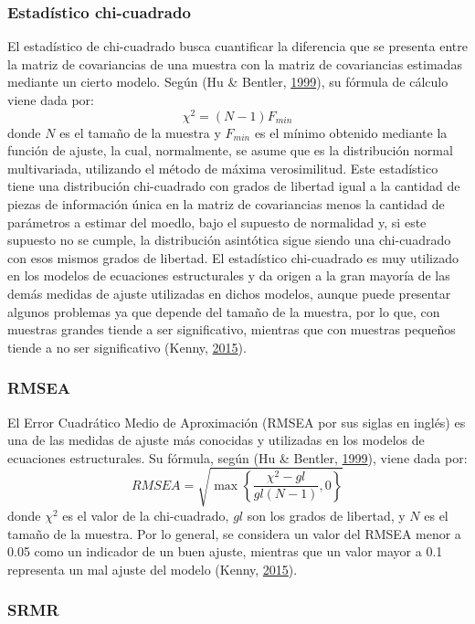 \documentclass[
]{article}
\begin{document}
\subsubsection{Estadístico chi-cuadrado}

El estadístico de chi-cuadrado busca cuantificar la diferencia que se
presenta entre la matriz de covariancias de una muestra con la matriz de
covariancias estimadas mediante un cierto modelo. Según (Hu \& Bentler,
\protect\hyperlink{ref-Hu1999}{1999}), su fórmula de cálculo viene dada
por: \[
  \chi^2 = (N-1) F_{min}
\] donde \(N\) es el tamaño de la muestra y \(F_{min}\) es el mínimo
obtenido mediante la función de ajuste, la cual, normalmente, se asume
que es la distribución normal multivariada, utilizando el método de
máxima verosimilitud. Este estadístico tiene una distribución
chi-cuadrado con grados de libertad igual a la cantidad de piezas de
información única en la matriz de covariancias menos la cantidad de
parámetros a estimar del moedlo, bajo el supuesto de normalidad y, si
este supuesto no se cumple, la distribución asintótica sigue siendo una
chi-cuadrado con esos mismos grados de libertad. El estadístico
chi-cuadrado es muy utilizado en los modelos de ecuaciones estructurales
y da origen a la gran mayoría de las demás medidas de ajuste utilizadas
en dichos modelos, aunque puede presentar algunos problemas ya que
depende del tamaño de la muestra, por lo que, con muestras grandes
tiende a ser significativo, mientras que con muestras pequeños tiende a
no ser significativo (Kenny, \protect\hyperlink{ref-Kenny2015}{2015}).

\subsubsection{RMSEA}

El Error Cuadrático Medio de Aproximación (RMSEA por sus siglas en
inglés) es una de las medidas de ajuste más conocidas y utilizadas en
los modelos de ecuaciones estructurales. Su fórmula, según (Hu \&
Bentler, \protect\hyperlink{ref-Hu1999}{1999}), viene dada por: \[
  RMSEA = \sqrt{\max\left\{\frac{\chi^2 - gl}{gl (N-1)} , 0 \right\}}
\] donde \(\chi^2\) es el valor de la chi-cuadrado, \(gl\) son los
grados de libertad, y \(N\) es el tamaño de la muestra. Por lo general,
se considera un valor del RMSEA menor a 0.05 como un indicador de un
buen ajuste, mientras que un valor mayor a 0.1 representa un mal ajuste
del modelo (Kenny, \protect\hyperlink{ref-Kenny2015}{2015}).

\subsubsection{SRMR}
\end{document}

